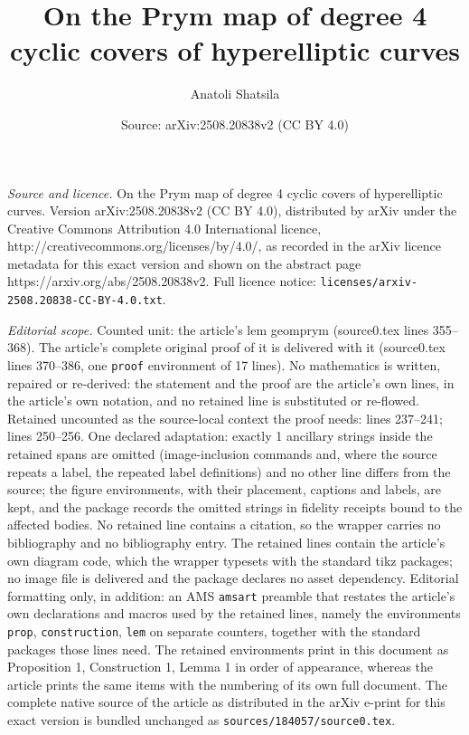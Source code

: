 \documentclass[10pt,a4paper]{amsart}
\title{On the Prym map of degree 4 cyclic covers of hyperelliptic curves}
\author{Anatoli Shatsila}
\date{Source: arXiv:2508.20838v2 (CC BY 4.0)}
\begin{document}
\maketitle

\noindent\emph{Source and licence.} On the Prym map of degree 4 cyclic covers of hyperelliptic curves. Version arXiv:2508.20838v2 (CC BY 4.0), distributed by arXiv under the Creative Commons Attribution 4.0 International licence, http://creativecommons.org/licenses/by/4.0/, as recorded in the arXiv licence metadata for this exact version and shown on the abstract page https://arxiv.org/abs/2508.20838v2. Full licence notice: \texttt{licenses/arxiv-2508.20838-CC-BY-4.0.txt}.\par\smallskip

\noindent\textit{Editorial scope.} Counted unit: the article's lem geomprym (source0.tex lines 355--368). The article's complete original proof of it is delivered with it (source0.tex lines 370--386, one \texttt{proof} environment of 17 lines). No mathematics is written, repaired or re-derived: the statement and the proof are the article's own lines, in the article's own notation, and no retained line is substituted or re-flowed.  Retained uncounted as the source-local context the proof needs: lines 237--241; lines 250--256.  One declared adaptation: exactly 1 ancillary strings inside the retained spans are omitted (image-inclusion commands and, where the source repeats a label, the repeated label definitions) and no other line differs from the source; the figure environments, with their placement, captions and labels, are kept, and the package records the omitted strings in fidelity receipts bound to the affected bodies.  No retained line contains a citation, so the wrapper carries no bibliography and no bibliography entry.  The retained lines contain the article's own diagram code, which the wrapper typesets with the standard tikz packages; no image file is delivered and the package declares no asset dependency.  Editorial formatting only, in addition: an AMS \texttt{amsart} preamble that restates the article's own declarations and macros used by the retained lines, namely the environments \texttt{prop}, \texttt{construction}, \texttt{lem} on separate counters, together with the standard packages those lines need.  The retained environments print in this document as Proposition 1, Construction 1, Lemma 1 in order of appearance, whereas the article prints the same items with the numbering of its own full document.  The complete native source of the article as distributed in the arXiv e-print for this exact version is bundled unchanged as \texttt{sources/184057/source0.tex}.
\end{document}
